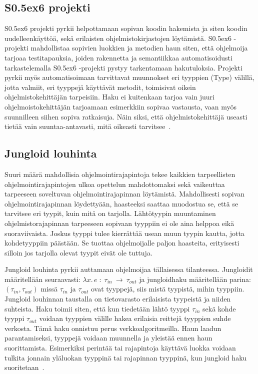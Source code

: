 \documentclass[finnish]{../tktltiki2}
\theoremstyle{definition}
\theoremstyle{remark}
\begin{document}
\subsection{S\raise0.5ex\hbox{6} projekti}
S\raise0.5ex\hbox{6} projekti pyrkii helpottamaan sopivan koodin hakemista ja siten koodin uudelleenkäyttöä, sekä erilaisten ohjelmistokirjastojen löytämistä. S\raise0.5ex\hbox{6} -projekti mahdollistaa sopivien luokkien ja metodien haun siten, että ohjelmoija tarjoaa testitapauksia, joiden rakennetta ja semantiikkaa automatisoidusti tarkastelemalla S\raise0.5ex\hbox{6} -projekti pystyy tarkentamaan hakutuloksia. Projekti pyrkii myös automatisoimaan tarvittavat muunnokset eri tyyppien (Type) välillä, jotta valmiit, eri tyyppejä käyttävät metodit, toimisivat oikein ohjelmistokehittäjän tarpeisiin. Haku ei kuitenkaan tarjoa vain juuri ohjelmoistokehittäjän tarjoamaan esimerkkiin sopivaa vastausta, vaan myös suunnilleen siihen sopiva ratkaisuja. Näin siksi, että ohjelmistokehittäjä useasti tietää vain suuntaa-antavasti, mitä oikeasti tarvitsee~\cite{what-to-search-for}.

\subsection{Jungloid louhinta}
Suuri määrä mahdollisia ohjelmointirajapintoja tekee kaikkien tarpeellisten ohjelmointirajapintojen ulkoa opettelun mahdottomaksi sekä vaikeuttaa tarpeeseen soveltuvan ohjelmointirajapinnan löytämistä. Mahdollisesti sopivan ohjelmointirajapinnan löydettyään, haasteeksi saattaa muodostua se, että se tarvitsee eri tyypit, kuin mitä on tarjolla. Lähtötyypin muuntaminen ohjelmistorajapinnan tarpeeseen sopivaan tyyppiin ei ole aina helppoa eikä suoraviivaista. Joskus tyyppi tulee kierrättää usean muun tyypin kautta, jotta kohdetyyppiin päästään. Se tuottaa ohjelmoijalle paljon haasteita, erityisesti silloin jos tarjolla olevat tyypit eivät ole tuttuja.

Jungloid louhinta pyrkii auttamaan ohjelmoijaa tällaisessa tilanteessa.
Jungloidit määritellään seuraavasti: $ \lambda x.\, e\; :\; \tau_{in}\:\to\:\tau_{out}$ ja jungloidhaku määritellään parina: $(\tau_{in}, \tau_{out})$ missä $\tau_{in}$ ja $\tau_{out}$ ovat tyyppejä, siis mistä tyypistä, mihin tyyppiin. Jungloid louhinnan taustalla on tietovarasto erilaisista tyypeistä ja niiden suhteista. Haku toimii siten, että kun tiedetään lähtö tyyppi $\tau_{in}$ sekä kohde tyyppi $\tau_{out}$ voidaan tyyppien välille hakea erilaisia reittejä tyyppien suhde verkosta. Tämä haku onnistuu perus verkkoalgoritmeilla. Haun laadun parantamiseksi, tyyppejä voidaan muunnella ja yleistää ennen haun suorittamista. Esimerkiksi perintää tai rajapintoja käyttävä luokka voidaan tulkita jonnain yläluokan tyyppinä tai rajapinnan tyyppinä, kun jungloid haku suoritetaan~\cite{jungloid-mining}.
\end{document}
